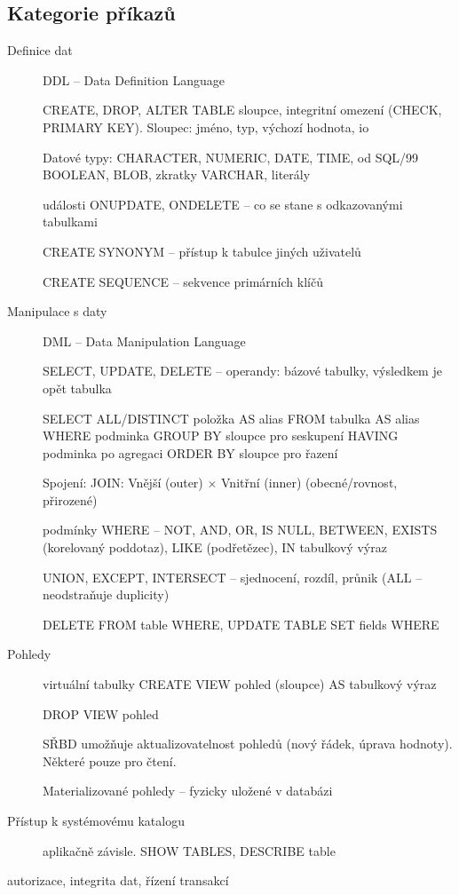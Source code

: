 \documentclass[a4paper, 11pt]{report}
\begin{document}
\subsection{Kategorie příkazů}
\begin{description}
	\item[Definice dat] DDL -- Data Definition Language
	
	CREATE, DROP, ALTER TABLE sloupce, integritní omezení (CHECK, PRIMARY KEY). Sloupec: jméno, typ, výchozí hodnota, io
	
	Datové typy: CHARACTER, NUMERIC, DATE, TIME, od SQL/99 BOOLEAN, BLOB, zkratky VARCHAR, literály
	
	události ONUPDATE, ONDELETE -- co se stane s odkazovanými tabulkami
	
	CREATE SYNONYM -- přístup k tabulce jiných uživatelů
	
	CREATE SEQUENCE -- sekvence primárních klíčů
	\item[Manipulace s daty] DML -- Data Manipulation Language
	
	SELECT, UPDATE, DELETE -- operandy: bázové tabulky, výsledkem je opět tabulka
	
	SELECT ALL/DISTINCT položka AS alias FROM tabulka AS alias WHERE podminka GROUP BY sloupce pro seskupení HAVING podminka po agregaci ORDER BY sloupce pro řazení
	
	Spojení: JOIN: Vnější (outer) $\times$ Vnitřní (inner) (obecné/rovnost, přirozené)
	
	podmínky WHERE -- NOT, AND, OR, IS NULL, BETWEEN, EXISTS (korelovaný poddotaz), LIKE (podřetězec), IN tabulkový výraz
	
	UNION, EXCEPT, INTERSECT -- sjednocení, rozdíl, průnik (ALL -- neodstraňuje duplicity)
	
	DELETE FROM table WHERE, UPDATE TABLE SET fields WHERE
	
	\item[Pohledy] virtuální tabulky
	CREATE VIEW pohled (sloupce) AS tabulkový výraz
	
	DROP VIEW pohled
	
	SŘBD umožňuje aktualizovatelnost pohledů (nový řádek, úprava hodnoty). Některé pouze pro čtení.
	
	Materializované pohledy -- fyzicky uložené v databázi
	
	\item[Přístup k systémovému katalogu] aplikačně závisle. SHOW TABLES, DESCRIBE table
	
	\item[autorizace, integrita dat, řízení transakcí]
\end{description}
\end{document}
